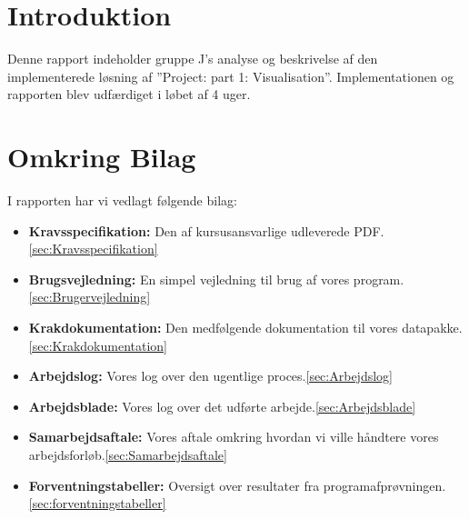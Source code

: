 \section{Introduktion}
Denne rapport indeholder gruppe J's analyse og beskrivelse af den implementerede løsning af ''Project: part 1: Visualisation''. Implementationen og rapporten blev udfærdiget i løbet af 4 uger.
\section{Omkring Bilag}
I rapporten har vi vedlagt følgende bilag:
\begin{itemize}
	\item \textbf{Kravsspecifikation:} Den af kursusansvarlige udleverede PDF.\ref{sec:Kravsspecifikation}
	\item \textbf{Brugsvejledning:} En simpel vejledning til brug af vores program.\ref{sec:Brugervejledning}
	\item \textbf{Krakdokumentation:} Den medfølgende dokumentation til vores datapakke.\ref{sec:Krakdokumentation}
	\item \textbf{Arbejdslog:} Vores log over den ugentlige proces.\ref{sec:Arbejdslog}
	\item \textbf{Arbejdsblade:} Vores log over det udførte arbejde.\ref{sec:Arbejdsblade}
	\item \textbf{Samarbejdsaftale:} Vores aftale omkring hvordan vi ville håndtere vores arbejdsforløb.\ref{sec:Samarbejdsaftale}
	\item \textbf{Forventningstabeller:} Oversigt over resultater fra programafprøvningen.\ref{sec:forventningstabeller}
\end{itemize}

